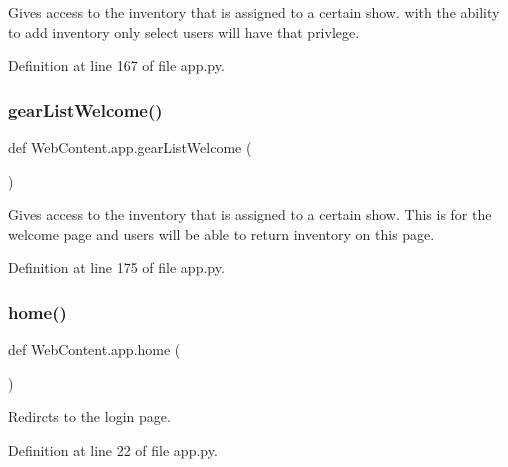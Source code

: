 \begin{DoxyVerb}Gives access to the inventory that is assigned to a certain show.
with the ability to add 
inventory only select users will have that privlege.
\end{DoxyVerb}
 

Definition at line 167 of file app.\+py.

\mbox{\label{namespace_web_content_1_1app_a1aefd89635932b2165c829b462687b74}} 
\subsubsection{\texorpdfstring{gear\+List\+Welcome()}{gearListWelcome()}}
{\footnotesize\ttfamily def Web\+Content.\+app.\+gear\+List\+Welcome (\begin{DoxyParamCaption}{ }\end{DoxyParamCaption})}

\begin{DoxyVerb}Gives access to the inventory that is assigned to a certain show.
This is for the welcome page and users will be able to 
return inventory on this page. 
\end{DoxyVerb}
 

Definition at line 175 of file app.\+py.

\mbox{\label{namespace_web_content_1_1app_ab0090e2c92ec892cf11fed49d580737a}} 
\subsubsection{\texorpdfstring{home()}{home()}}
{\footnotesize\ttfamily def Web\+Content.\+app.\+home (\begin{DoxyParamCaption}{ }\end{DoxyParamCaption})}

\begin{DoxyVerb}Redircts to the login page.
\end{DoxyVerb}
 

Definition at line 22 of file app.\+py.

\mbox{\label{namespace_web_content_1_1app_a73068e2cc15ecd211e7fbdbe744dbcf0}} 
